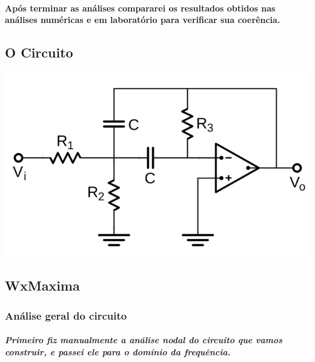 \documentclass[12pt,twoside, a4paper, twocolumn]{article}
\begin{document}
\paragraph*{Após terminar as análises compararei os resultados obtidos nas análises numéricas e em laboratório para verificar sua coerência.}








\subsection{O Circuito}
\begin{adjustbox}{scale=0.30}
    \includegraphics{AnaliseNodal.png}
\end{adjustbox}
\newpage
\subsection{WxMaxima}




\subsubsection{Análise geral do circuito}








\subparagraph*{Primeiro fiz manualmente a análise nodal do circuito que vamos construir, e passei ele para o domínio da frequência.}
\subparagraph*{}
\end{document}
